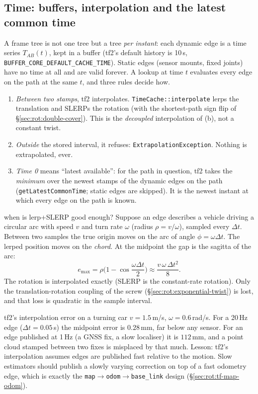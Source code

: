 \subsection{Time: buffers, interpolation and the latest common time}\label{sec:rot:tf-time}

A frame tree is not one tree but a tree \emph{per instant}: each dynamic edge is a time series $T_{AB}(t)$, kept in a buffer (tf2's default history is 10\,s, \texttt{BUFFER\_CORE\_DEFAULT\_CACHE\_TIME}). Static edges (sensor mounts, fixed joints) have no time at all and are valid forever. A lookup at time $t$ evaluates every edge on the path at the same $t$, and three rules decide how.

\begin{enumerate}
\item \emph{Between two stamps}, tf2 interpolates. \texttt{TimeCache::interpolate} lerps the translation and SLERPs the rotation (with the shortest-path sign flip of \S\ref{sec:rot:double-cover}). This is the \emph{decoupled} interpolation of (b), not a constant twist.
\item \emph{Outside} the stored interval, it refuses: \texttt{ExtrapolationException}. Nothing is extrapolated, ever.
\item \emph{Time 0} means ``latest available'': for the path in question, tf2 takes the \emph{minimum} over the newest stamps of the dynamic edges on the path (\texttt{getLatestCommonTime}; static edges are skipped). It is the newest instant at which every edge on the path is known.
\end{enumerate}

\begin{deriv}{when is lerp+SLERP good enough?}
Suppose an edge describes a vehicle driving a circular arc with speed $v$ and turn rate $\omega$ (radius $\rho=v/\omega$), sampled every $\Delta t$. Between two samples the true origin moves on the arc of angle $\phi=\omega\Delta t$. The lerped position moves on the \emph{chord}. At the midpoint the gap is the sagitta of the arc:
\[
e_{\max}=\rho\Big(1-\cos\frac{\omega\Delta t}{2}\Big)\approx\frac{v\,\omega\,\Delta t^2}{8}.
\]
The rotation is interpolated exactly (SLERP is the constant-rate rotation). Only the translation-rotation coupling of the screw (\S\ref{sec:rot:exponential-twist}) is lost, and that loss is quadratic in the sample interval.
\end{deriv}

\begin{example}{tf2's interpolation error on a turning car}
$v=1.5$\,m/s, $\omega=0.6$\,rad/s. For a 20\,Hz edge ($\Delta t=0.05$\,s) the midpoint error is $0.28$\,mm, far below any sensor. For an edge published at 1\,Hz (a GNSS fix, a slow localiser) it is $112$\,mm, and a point cloud stamped between two fixes is misplaced by that much. Lesson: tf2's interpolation assumes edges are published fast relative to the motion. Slow estimators should publish a slowly varying correction on top of a fast odometry edge, which is exactly the \texttt{map}$\to$\texttt{odom}$\to$\texttt{base\_link} design (\S\ref{sec:rot:tf-map-odom}).
\end{example}


